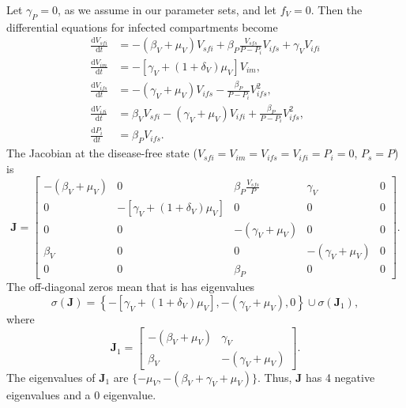 \documentclass{article}
\newcommand{\md}{\mathrm{d}}
\newcommand{\mat}[1]{\mathbf{#1}}
\begin{document}
Let $\gamma_P = 0$, as we assume in our parameter sets, and 
let $f_V = 0$.  Then the differential equations for infected
compartments become
\begin{equation}
  \label{ODE_infected}
  \begin{split}
    \frac{\md V_{sfi}}{\md t}
    &=
    - (\beta_V + \mu_V) V_{sfi}
    + \beta_P \frac{V_{sfs}}{P - P_i} V_{ifs}
    + \gamma_V V_{ifi}
    \\
    \frac{\md V_{im}}{\md t}
    &=
    - [\gamma_V + (1 + \delta_V) \mu_V] V_{im},
    \\
    \frac{\md V_{ifs}}{\md t}
    &=
    - (\gamma_V + \mu_V) V_{ifs}
    - \frac{\beta_P}{P - P_i} V_{ifs}^2,
    \\
    \frac{\md V_{ifi}}{\md t}
    &=
    \beta_V V_{sfi}
    - (\gamma_V + \mu_V) V_{ifi}
    + \frac{\beta_P}{P - P_i} V_{ifs}^2,
    \\
    \frac{\md P_i}{\md t}
    &=
    \beta_P V_{ifs}.
  \end{split}
\end{equation}
The Jacobian at the disease-free state
($V_{sfi} = V_{im} = V_{ifs} = V_{ifi} = P_i = 0$, $P_s = P$) is
\begin{equation}
  \mat{J} = 
  \begin{bmatrix}
    - (\beta_V + \mu_V) & 0 & \beta_P \frac{V_{sfs}}{P}
    & \gamma_V & 0
    \\
    0 & - [\gamma_V + (1 + \delta_V) \mu_V] & 0 & 0 & 0
    \\
    0 & 0 & - (\gamma_V + \mu_V) & 0 & 0
    \\
    \beta_V & 0 & 0 & - (\gamma_V + \mu_V) & 0
    \\
    0 & 0 & \beta_P & 0 & 0
  \end{bmatrix}.
\end{equation}
The off-diagonal zeros mean that is has eigenvalues
\begin{equation}
  \sigma(\mat{J}) = \left\{
    - [\gamma_V + (1 + \delta_V) \mu_V], - (\gamma_V + \mu_V), 0
  \right\}
  \cup \sigma(\mat{J}_1),
\end{equation}
where
\begin{equation}
  \mat{J}_1 = 
  \begin{bmatrix}
    - (\beta_V + \mu_V) & \gamma_V
    \\
    \beta_V & - (\gamma_V + \mu_V)
  \end{bmatrix}.
\end{equation}
The eigenvalues of $\mat{J}_1$ are
$\{- \mu_V, - (\beta_V + \gamma_V + \mu_V)\}$.  Thus, $\mat{J}$ has 4
negative eigenvalues and a $0$ eigenvalue.
\end{document}
